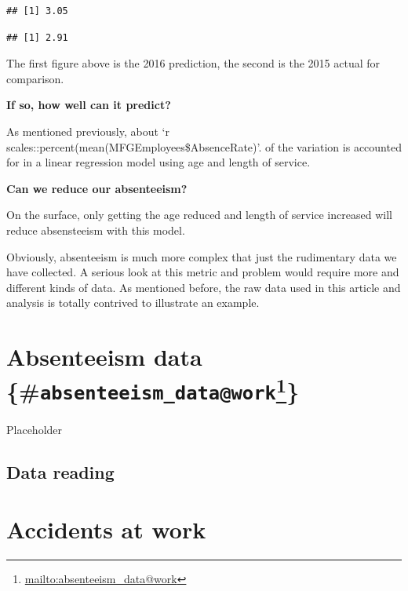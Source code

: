 \documentclass[12pt, krantz2,]{krantz}
\makeatletter
\newenvironment{Shaded}{\begin{snugshade}}{\end{snugshade}}
\newcommand{\KeywordTok}[1]{\textcolor[rgb]{0.27,0.27,0.27}{\textbf{#1}}}
\newcommand{\NormalTok}[1]{#1}
\newcommand{\OperatorTok}[1]{\textcolor[rgb]{0.43,0.43,0.43}{\textbf{#1}}}
\renewcommand{\href}[2]{#2\footnote{\url{#1}}}
\newenvironment{kframe}{%
\medskip{}
\setlength{\fboxsep}{.8em}
 \def\at@end@of@kframe{}%
 \ifinner\ifhmode%
  \def\at@end@of@kframe{\end{minipage}}%
  \begin{minipage}{\columnwidth}%
 \fi\fi%
 \def\FrameCommand##1{\hskip\@totalleftmargin \hskip-\fboxsep
 \colorbox{shadecolor}{##1}\hskip-\fboxsep
     \hskip-\linewidth \hskip-\@totalleftmargin \hskip\columnwidth}%
 \MakeFramed {\advance\hsize-\width
   \@totalleftmargin\z@ \linewidth\hsize
   \@setminipage}}%
 {\par\unskip\endMakeFramed%
 \at@end@of@kframe}
\renewenvironment{Shaded}{\begin{kframe}}{\end{kframe}}
\makeatother
\begin{document}
\begin{verbatim}
## [1] 3.05
\end{verbatim}

\begin{Shaded}
\end{Shaded}

\begin{verbatim}
## [1] 2.91
\end{verbatim}

The first figure above is the 2016 prediction, the second is the 2015 actual for comparison.

\textbf{If so, how well can it predict?}

As mentioned previously, about `r scales::percent(mean(MFGEmployees\$AbsenceRate)'. of the variation is accounted for in a linear regression model using age and length of service.

\textbf{Can we reduce our absenteeism?}

On the surface, only getting the age reduced and length of service increased will reduce absensteeism with this model.

Obviously, absenteeism is much more complex that just the rudimentary data we have collected. A serious look at this metric and problem would require more and different kinds of data. As mentioned before, the raw data used in this article and analysis is totally contrived to illustrate an example.

\hypertarget{absenteeism-data-absenteeism_datawork}{%
\chapter{\texorpdfstring{Absenteeism data \{\#\href{mailto:absenteeism_data@work}{\nolinkurl{absenteeism\_data@work}}\}}{Absenteeism data \{\#absenteeism\_data@work\}}}\label{absenteeism-data-absenteeism_datawork}}

Placeholder

\hypertarget{data-reading}{%
\section{Data reading}\label{data-reading}}

\hypertarget{accidents_at_work}{%
\chapter{Accidents at work}\label{accidents_at_work}}
\end{document}
